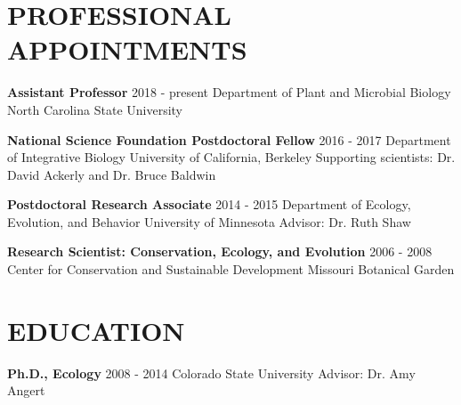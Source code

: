 \documentclass[11pt,english]{article}\usepackage[]{graphicx}\usepackage[]{xcolor}
\begin{document}
\begin{flushleft}
\section*{PROFESSIONAL APPOINTMENTS}
\vspace{-0.5ex}

{\bf Assistant Professor} \hfill {2018 - present} \newline
Department of Plant and Microbial Biology \newline
North Carolina State University
\vspace{0.5ex}

{\bf National Science Foundation Postdoctoral Fellow} \hfill {2016 - 2017} \newline
Department of Integrative Biology \newline
University of California, Berkeley \newline
Supporting scientists: Dr. David Ackerly and Dr. Bruce Baldwin
\vspace{0.5ex}

{\bf Postdoctoral Research Associate} \hfill {2014 - 2015} \newline
Department of Ecology, Evolution, and Behavior \newline
University of Minnesota \newline
Advisor: Dr. Ruth Shaw
\vspace{0.5ex}

{\bf Research Scientist: Conservation, Ecology, and Evolution} \hfill {2006 - 2008} \newline
Center for Conservation and Sustainable Development \newline
Missouri Botanical Garden


\vspace{1ex}
\section*{EDUCATION}
\vspace{-0.5ex}

{\bf Ph.D., Ecology} \hfill {2008 - 2014} \newline
Colorado State University \newline
Advisor: Dr. Amy Angert
\vspace{0.5ex}


\end{flushleft}
\end{document}
